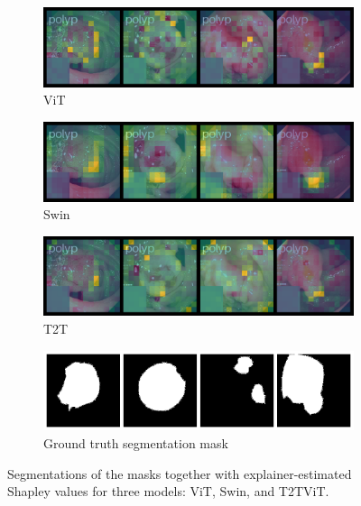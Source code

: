 \documentclass[magisterska,en]{pracamgr}
\begin{document}
\begin{figure}
\centering
\begin{subfigure}{0.55\textwidth}
   \includegraphics[width=1\linewidth]{./images/gastro_shap_for_segm_vit_2.png}
   \caption{ViT}
   \label{fig:Ng2}
\end{subfigure}
\begin{subfigure}{0.55\textwidth}
   \includegraphics[width=1\linewidth]{./images/gastro_shap_for_segm_swin_2.png}
   \caption{Swin}
   \label{fig:Ng2}
\end{subfigure}
\begin{subfigure}{0.55\textwidth}
   \includegraphics[width=1\linewidth]{./images/gastro_shap_for_segm_t2t_vit_2.png}
   \caption{T2T}
   \label{fig:Ng2}
\end{subfigure}
\begin{subfigure}{0.55\textwidth}
   \includegraphics[width=1\linewidth]{./images/gastro_segmentation_2.png}
   \caption{Ground truth segmentation mask}
   \label{fig:Ng1}
\end{subfigure}
\caption{Segmentations of the masks together with explainer-estimated Shapley values for three models: ViT, Swin, and T2T\textunderscore ViT.}
\label{segm_shap_2}
\end{figure}
\end{document}
